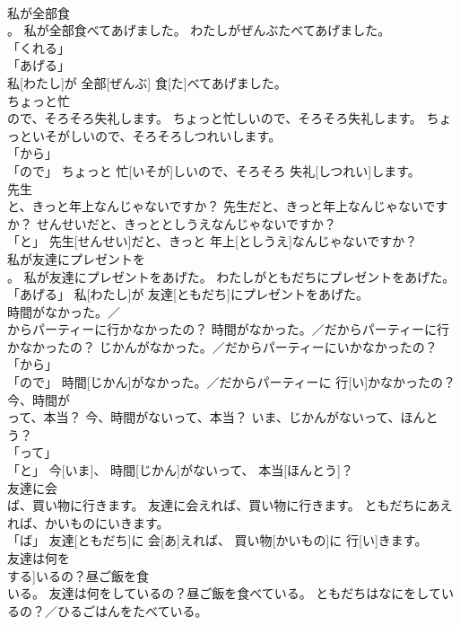 \documentclass[8pt]{extreport}
\begin{document}
\begin{CJK}{UTF8}{min}
\\	私が全部食
\\	。	私が全部食べてあげました。	わたしがぜんぶたべてあげました。	
\\	「くれる」 
\\	「あげる」 
\\	私[わたし]が 全部[ぜんぶ] 食[た]べてあげました。		
\\	ちょっと忙
\\	ので、そろそろ失礼します。	ちょっと忙しいので、そろそろ失礼します。	ちょっといそがしいので、そろそろしつれいします。	
\\	「から」 
\\	「ので」	ちょっと 忙[いそが]しいので、そろそろ 失礼[しつれい]します。		
\\	先生
\\	と、きっと年上なんじゃないですか？	先生だと、きっと年上なんじゃないですか？	せんせいだと、きっととしうえなんじゃないですか？	
\\	「と」	先生[せんせい]だと、きっと 年上[としうえ]なんじゃないですか？		
\\	私が友達にプレゼントを
\\	。	私が友達にプレゼントをあげた。	わたしがともだちにプレゼントをあげた。	
\\	「あげる」	私[わたし]が 友達[ともだち]にプレゼントをあげた。		
\\	時間がなかった。／
\\	からパーティーに行かなかったの？	時間がなかった。／だからパーティーに行かなかったの？	じかんがなかった。／だからパーティーにいかなかったの？	
\\	「から」 
\\	「ので」	時間[じかん]がなかった。／だからパーティーに 行[い]かなかったの？		
\\	今、時間が
\\	って、本当？	今、時間がないって、本当？	いま、じかんがないって、ほんとう？	
\\	「って」 
\\	「と」	今[いま]、 時間[じかん]がないって、 本当[ほんとう]？		
\\	友達に会
\\	ば、買い物に行きます。	友達に会えれば、買い物に行きます。	ともだちにあえれば、かいものにいきます。	
\\	「ば」	友達[ともだち]に 会[あ]えれば、 買い物[かいもの]に 行[い]きます。		
\\	友達は何を
\\	する]いるの？昼ご飯を食
\\	いる。	友達は何をしているの？昼ご飯を食べている。	ともだちはなにをしているの？／ひるごはんをたべている。	

\end{CJK}
\end{document}

